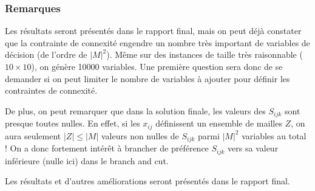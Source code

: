 \documentclass[a4paper,11pt] {article}
\begin{document}

\subsubsection{Remarques}

Les résultats seront présentés dans le rapport final, mais on peut
déjà constater que la contrainte de connexité engendre un nombre très
important de variables de décision (de l'ordre de $|M|^2$). Même sur
des instances de taille très raisonnable ($10 \times 10$), on génère
10000 variables. Une première question sera donc de se demander si on
peut limiter le nombre de variables à ajouter pour définir les
contraintes de connexité.

De plus, on peut remarquer que dans la solution finale, les valeurs
des $S_{ijk}$ sont presque toutes nulles. En effet, si les $x_{ij}$
définissent un ensemble de mailles $Z$, on aura seulement
$|Z| \leq |M|$ valeurs non nulles de $S_{ijk}$ parmi $|M|^2$ variables
au total ! On a donc fortement intérêt à brancher de préférence
$S_{ijk}$ vers sa valeur inférieure (nulle ici) dans le branch and cut.

Les résultats et d'autres améliorations seront présentés dans le
rapport final.
\end{document}
